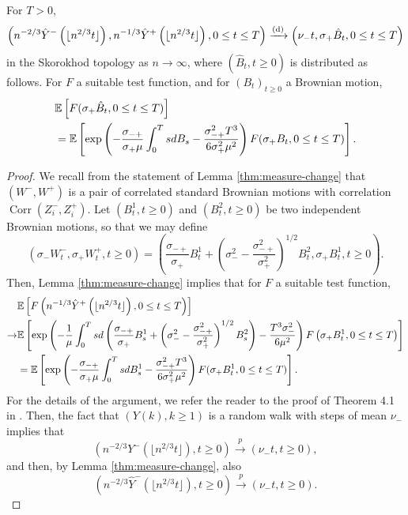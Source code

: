 \begin{theorem}\label{theorem.convaftermeasurechange} 
 For $T>0$,
$$\left(n^{-2/3}\hat{Y}^-\left(\lfloor n^{2/3} t\rfloor\right), n^{-1/3}\hat{Y}^+\left(\lfloor  n^{2/3} t\rfloor\right), 0\leq t \leq T \right) \xrightarrow[]{\mathrm{(d)}} \left( \nu_- t, \sigma_+\hat{B}_t, 0 \leq t \leq T \right)$$
in the Skorokhod topology as $n\to \infty$, where $(\hat{B}_t, t\geq 0)$ is distributed as follows.
For $F$ a suitable test function, and for $(B_t)_{t\geq 0}$ a Brownian motion,
\begin{align*} &{\mathbb E}\left[F(\sigma_+ \hat{B}_t,0\leq t \leq T)\right]\\&={\mathbb E}\left[\exp\left(-\frac{\sigma_{-+}}{\sigma_+ \mu} \int_0^T s dB_s -\frac{\sigma_{-+}^2 T^3}{6\sigma_+^2 \mu^2}\right)F(\sigma_+ B_t,   0\leq t \leq T)\right].\end{align*}

\end{theorem}
\begin{proof}
 We recall from the statement of Lemma \ref{thm:measure-change} that $(W^-,W^+)$ is a pair of correlated standard Brownian motions with correlation $\operatorname{Corr}(Z_i^-,Z_i^+)$. 
Let $(B^1_t,t\geq 0)$ and $(B^2_t,t\geq 0)$ be two independent Brownian motions, so that we may define $$(\sigma_-W^-_t,\sigma_+W^+_t,t\geq 0)=\left(\frac{\sigma_{-+}}{\sigma_+}B_t^1+\left(\sigma_-^2-\frac{\sigma_{-+}^2}{\sigma_+^2}\right)^{1/2} B_t^2, \sigma_+ B_t^1, t\geq 0\right).$$ 
 Then, Lemma \ref{thm:measure-change} implies that for $F$ a suitable test function, 
 \begin{align*}&\E\left[F\left(n^{-1/3}\hat{Y}^+\left(\lfloor n^{2/3}t\rfloor\right), 0\leq t \leq T \right) \right]\\\to& \E\left[\exp\left(-\frac{1}{\mu}\int_0^Tsd\left(\frac{\sigma_{-+}}{\sigma_+}B_s^1+\left(\sigma_-^2-\frac{\sigma_{-+}^2}{\sigma_+^2}\right)^{1/2}B_s^2\right) - \frac{T^3 \sigma_-^2}{6\mu^2}\right) F\left(\sigma_+ B_t^1, 0\leq t \leq T\right)\right]\\
 &=\E\left[\exp\left(-\frac{\sigma_{-+}}{\sigma_+ \mu} \int_0^T s dB^1_s -\frac{\sigma_{-+}^2 T^3}{6\sigma_+^2 \mu^2}\right)F(\sigma_+ B^1_t,   0\leq t \leq T)\right].\end{align*}
 For the details of the argument, we refer the reader to the proof of Theorem 4.1 in \cite{conchon--kerjanStableGraphMetric2020}. Then, the fact that $(Y(k),k\geq 1)$ is a random walk with steps of mean $\nu_-$ implies that
 $$\left(n^{-2/3}Y^-\left(\lfloor n^{2/3}t\rfloor\right),t\geq 0\right)\overset{p}{\to}\left(\nu_- t,t\geq 0\right),$$
 and then, by Lemma \ref{thm:measure-change}, also 
 $$\left(n^{-2/3}\hat{Y}^-\left(\lfloor n^{2/3}t\rfloor\right),t\geq 0\right)\overset{p}{\to}\left(\nu_- t,t\geq 0\right).$$
 \end{proof}
